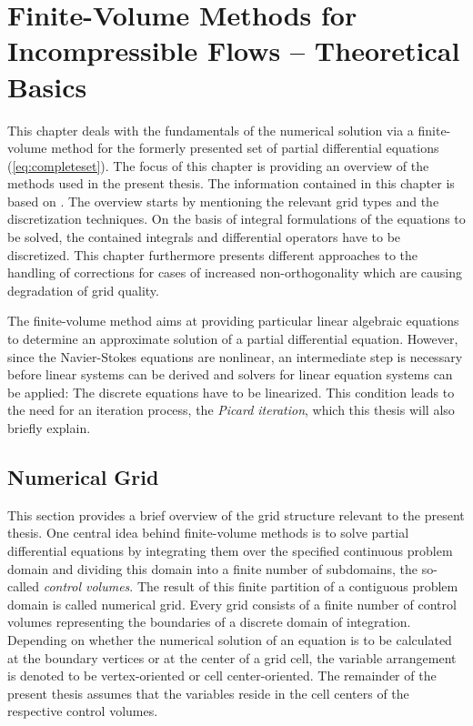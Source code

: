\chapter{Finite-Volume Methods for Incompressible Flows -- Theoretical Basics}
\label{sec:fvm}

This chapter deals with the fundamentals of the numerical solution via a finite-volume method for the formerly presented set of partial differential equations (\ref{eq:completeset}). The focus of this chapter is providing an overview of the methods used in the present thesis. The information contained in this chapter is based on \cite{ferziger02,jasak96,schaefer99,muzaferja}. The overview starts by mentioning the relevant grid types and the discretization techniques. On the basis of integral formulations of the equations to be solved, the contained integrals and differential operators have to be discretized. This chapter furthermore presents different approaches to the handling of corrections for cases of increased non-orthogonality which are causing degradation of grid quality.
  
The finite-volume method aims at providing particular linear algebraic equations to determine an approximate solution of a partial differential equation. However, since the Navier-Stokes equations are nonlinear, an intermediate step is necessary before linear systems can be derived and solvers for linear equation systems can be applied: The discrete equations have to be linearized. This condition leads to the need for an iteration process, the \emph{Picard iteration}, which this thesis will also briefly explain. 
      
\section{Numerical Grid}

This section provides a brief overview of the grid structure relevant to the present thesis. One central idea behind finite-volume methods is to solve partial differential equations by integrating them over the specified continuous problem domain and dividing this domain into a finite number of subdomains, the so-called \emph{control volumes}. The result of this finite partition of a contiguous problem domain is called numerical grid. Every grid consists of a finite number of control volumes representing the boundaries of a discrete domain of integration. Depending on whether the numerical solution of an equation is to be calculated at the boundary vertices or at the center of a grid cell, the variable arrangement is denoted to be vertex-oriented or cell center-oriented. The remainder of the present thesis assumes that the variables reside in the cell centers of the respective control volumes.

